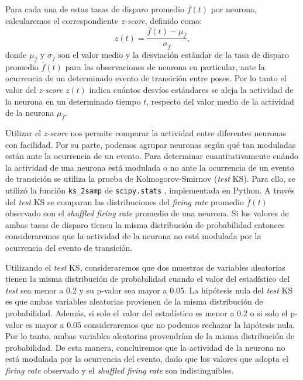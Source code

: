 Para cada una de estas tasas de disparo promedio $\bar{f}(t)$ por neurona, calcularemos el correspondiente \textit{z-score}, definido como:
\begin{equation}
    z(t) = \frac{\bar{f}(t) - \mu_{\bar{f}}}{\sigma_{\bar{f}}},
\end{equation}
donde $\mu_{\bar{f}}$ y $\sigma_{\bar{f}}$ son el valor medio y la desviación estándar de la tasa de disparo promedio $\bar{f}(t)$ para las observaciones de neurona en particular, ante la ocurrencia de un determinado evento de transición entre poses. Por lo tanto el valor del \textit{z-score} $z(t)$ indica cuántos desvíos estándares se aleja la actividad de la neurona en un determinado tiempo $t$, respecto del valor medio de la actividad de la neurona $\mu_{\bar{f}}$.

Utilizar el \textit{z-score} nos permite comparar la actividad entre diferentes neuronas con facilidad. Por su parte, podemos agrupar neuronas según qué tan moduladas están ante la ocurrencia de un evento. Para determinar cuantitativamente cuándo la actividad de una neurona está modulada o no ante la ocurrencia de un evento de transición se utiliza la prueba de Kolmogorov-Smirnov (\textit{test} KS). Para ello, se utilizó la función \texttt{ks\_2samp} de \texttt{scipy.stats} \cite{scipy}, implementada en Python. A través del \textit{test} KS se comparan las distribuciones del \textit{firing rate} promedio $\bar{f}(t)$ observado con el \textit{shuffled firing rate} promedio de una neurona. Si los valores de ambas tasas de disparo tienen la misma distribución de probabilidad entonces consideraremos que la actividad de la neurona no está modulada por la ocurrencia del evento de transición.

Utilizando el \textit{test} KS, consideraremos que dos muestras de variables aleatorias tienen la misma distribución de probabilidad cuando el valor del estadístico del \textit{test} sea menor a 0.2 y su p-valor sea mayor a 0.05. La hipótesis nula del \textit{test} KS es que ambas variables aleatorias provienen de la misma distribución de probabilidad. Además, si solo el valor del estadístico es menor a 0.2 o si solo el p-valor es mayor a 0.05 consideraremos que no podemos rechazar la hipótesis nula. Por lo tanto, ambas variables aleatorias provendrían de la misma distribución de probabilidad. De esta manera, concluiremos que la actividad de la neurona no está modulada por la ocurrencia del evento, dado que los valores que adopta el \textit{firing rate} observado y el \textit{shuffled firing rate} son indistinguibles.

